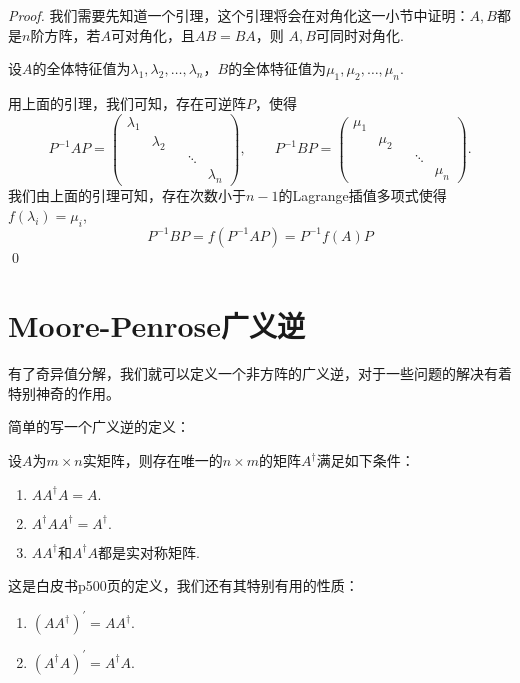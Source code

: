 \begin{proof}
	我们需要先知道一个引理，这个引理将会在对角化这一小节中证明：$A,B$都是$n$阶方阵，若$A$可对角化，且$AB=BA$，则
	$A,B$可同时对角化.

	设$A$的全体特征值为$\lambda_1, \lambda_2, \dots, \lambda_n$，$B$的全体特征值为$\mu_1,\mu_2,\dots,\mu_n$.

	用上面的引理，我们可知，存在可逆阵$P$，使得
	$$
		P^{-1} A P = \begin{pmatrix}
			\lambda_1 & & &\\
			& \lambda_2 & & \\
			& & & \ddots & \\
			& & & & \lambda_n
		\end{pmatrix}, \quad \quad P^{-1} B P = \begin{pmatrix}
			\mu_1 & & &\\
			& \mu_2 & & \\
			& & & \ddots & \\
			& & & & \mu_n
		\end{pmatrix}.
	$$
	我们由上面的引理可知，存在次数小于$n-1$的Lagrange插值多项式使得$f(\lambda_i)=\mu_i$,
	$$
		P^{-1} B P = f(P^{-1} A P) = P^{-1} f(A) P
	$$
	\qed{}
\end{proof}

\section*{Moore-Penrose广义逆}

有了奇异值分解，我们就可以定义一个非方阵的广义逆，对于一些问题的解决有着特别神奇的作用。

简单的写一个广义逆的定义：

\begin{definition}
	设$A$为$m \times n$实矩阵，则存在唯一的$n \times m$的矩阵$A ^\dagger$满足如下条件：
	\begin{enumerate}
		\item $A A^\dagger A = A.$
		\item $A^\dagger A A^\dagger = A^\dagger.$
		\item $AA^\dagger$和$A^\dagger A$都是实对称矩阵.
	\end{enumerate}
\end{definition}

这是白皮书p500页的定义，我们还有其特别有用的性质：
\begin{enumerate}
	\item $(AA^\dagger)^\prime = A A^\dagger.$
	\item $(A^\dagger A)^\prime = A^\dagger A.$
\end{enumerate}

